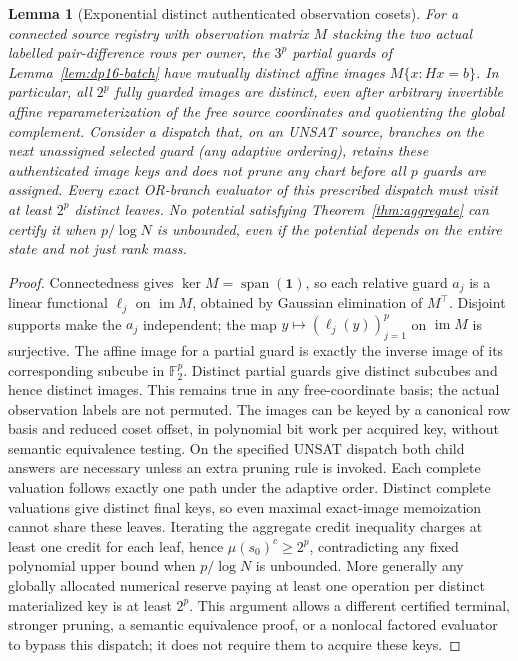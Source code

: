 \documentclass[11pt]{article}
\newtheorem{lemma}[theorem]{Lemma}
\begin{document}
\begin{lemma}[Exponential distinct authenticated observation cosets]\label{lem:dp16-credit}
For a connected source registry with observation matrix $M$ stacking the two actual labelled pair-difference rows per owner, the $3^p$ partial guards of Lemma~\ref{lem:dp16-batch} have mutually distinct affine images $M\{x:Hx=b\}$. In particular, all $2^p$ fully guarded images are distinct, even after arbitrary invertible affine reparameterization of the free source coordinates and quotienting the global complement. Consider a dispatch that, on an UNSAT source, branches on the next unassigned selected guard (any adaptive ordering), retains these authenticated image keys and does not prune any chart before all $p$ guards are assigned. Every exact OR-branch evaluator of this prescribed dispatch must visit at least $2^p$ distinct leaves. No potential satisfying Theorem~\ref{thm:aggregate} can certify it when $p/\log N$ is unbounded, even if the potential depends on the entire state and not just rank mass.
\end{lemma}
\begin{proof}
Connectedness gives $\ker M=\operatorname{span}(\mathbf 1)$, so each relative guard $a_j$ is a linear functional $\ell_j$ on $\operatorname{im}M$, obtained by Gaussian elimination of $M^\top$. Disjoint supports make the $a_j$ independent; the map $y\mapsto(\ell_j(y))_{j=1}^p$ on $\operatorname{im}M$ is surjective. The affine image for a partial guard is exactly the inverse image of its corresponding subcube in $\mathbb F_2^p$. Distinct partial guards give distinct subcubes and hence distinct images. This remains true in any free-coordinate basis; the actual observation labels are not permuted. The images can be keyed by a canonical row basis and reduced coset offset, in polynomial bit work per acquired key, without semantic equivalence testing.
On the specified UNSAT dispatch both child answers are necessary unless an extra pruning rule is invoked. Each complete valuation follows exactly one path under the adaptive order. Distinct complete valuations give distinct final keys, so even maximal exact-image memoization cannot share these leaves. Iterating the aggregate credit inequality charges at least one credit for each leaf, hence $\mu(s_0)^c\ge 2^p$, contradicting any fixed polynomial upper bound when $p/\log N$ is unbounded. More generally any globally allocated numerical reserve paying at least one operation per distinct materialized key is at least $2^p$. This argument allows a different certified terminal, stronger pruning, a semantic equivalence proof, or a nonlocal factored evaluator to bypass this dispatch; it does not require them to acquire these keys.
\end{proof}
\end{document}
